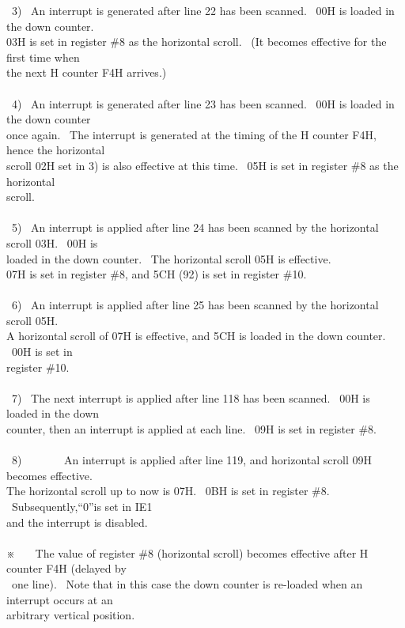 \documentclass[a4paper,10pt]{article}
\begin{document}
\newpage

\noindent \ 3) \ An interrupt is generated after line 22 has been scanned. \ 00H is loaded in the down counter.\\
03H is set in register \#8 as the horizontal scroll. \ (It becomes effective for the first time when\\
the next H counter F4H arrives.)\\
\\
\phantom \ 4) \ An interrupt is generated after line 23 has been scanned. \ 00H is loaded in the down counter\\
once again. \ The interrupt is generated at the timing of the H counter F4H, hence the horizontal\\
scroll 02H set in 3) is also effective at this time. \ 05H is set in register \#8 as the horizontal\\
scroll.\\
\\
\phantom \ 5) \ An interrupt is applied after line 24 has been scanned by the horizontal scroll 03H. \ 00H is\\
loaded in the down counter. \ The horizontal scroll 05H is effective.\\
07H is set in register \#8, and 5CH (92) is set in register \#10.\\
\\
\phantom \ 6) \ An interrupt is applied after line 25 has been scanned by the horizontal scroll 05H.\\
A horizontal scroll of 07H is effective, and 5CH is loaded in the down counter. \ 00H is set in\\
register \#10.\\
\\
\phantom \ 7) \ The next interrupt is applied after line 118 has been scanned. \ 00H is loaded in the down\\
counter, then an interrupt is applied at each line. \ 09H is set in register \#8.\\
\\
\phantom \ 8) \ \ \ \ \ \ \ An interrupt is applied after line 119, and horizontal scroll 09H becomes effective.\\
The horizontal scroll up to now is 07H. \ 0BH is set in register \#8. \ Subsequently,``0''is set in IE1\\
and the interrupt is disabled.\\
\\
※ \ \ \ The value of register \#8 (horizontal scroll) becomes effective after H counter F4H (delayed by\\
\phantom \ one line). \ Note that in this case the down counter is re-loaded when an interrupt occurs at an\\
arbitrary vertical position.
\end{document}
